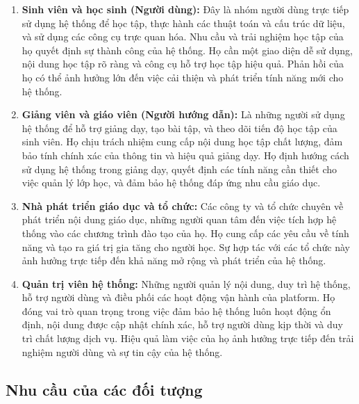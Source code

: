 \begin{enumerate}
\item \textbf{Sinh viên và học sinh (Người dùng):} Đây là nhóm người dùng trực tiếp sử dụng hệ thống để học tập, thực hành các thuật toán và cấu trúc dữ liệu, và sử dụng các công cụ trực quan hóa. Nhu cầu và trải nghiệm học tập của họ quyết định sự thành công của hệ thống. Họ cần một giao diện dễ sử dụng, nội dung học tập rõ ràng và công cụ hỗ trợ học tập hiệu quả. Phản hồi của họ có thể ảnh hưởng lớn đến việc cải thiện và phát triển tính năng mới cho hệ thống.

\item \textbf{Giảng viên và giáo viên (Người hướng dẫn):} Là những người sử dụng hệ thống để hỗ trợ giảng dạy, tạo bài tập, và theo dõi tiến độ học tập của sinh viên. Họ chịu trách nhiệm cung cấp nội dung học tập chất lượng, đảm bảo tính chính xác của thông tin và hiệu quả giảng dạy. Họ định hướng cách sử dụng hệ thống trong giảng dạy, quyết định các tính năng cần thiết cho việc quản lý lớp học, và đảm bảo hệ thống đáp ứng nhu cầu giáo dục.

\item \textbf{Nhà phát triển giáo dục và tổ chức:} Các công ty và tổ chức chuyên về phát triển nội dung giáo dục, những người quan tâm đến việc tích hợp hệ thống vào các chương trình đào tạo của họ. Họ cung cấp các yêu cầu về tính năng và tạo ra giá trị gia tăng cho người học. Sự hợp tác với các tổ chức này ảnh hưởng trực tiếp đến khả năng mở rộng và phát triển của hệ thống.

\item \textbf{Quản trị viên hệ thống:} Những người quản lý nội dung, duy trì hệ thống, hỗ trợ người dùng và điều phối các hoạt động vận hành của platform. Họ đóng vai trò quan trọng trong việc đảm bảo hệ thống luôn hoạt động ổn định, nội dung được cập nhật chính xác, hỗ trợ người dùng kịp thời và duy trì chất lượng dịch vụ. Hiệu quả làm việc của họ ảnh hưởng trực tiếp đến trải nghiệm người dùng và sự tin cậy của hệ thống.
\end{enumerate}

\subsection{Nhu cầu của các đối tượng}
\label{subsec:needs}

